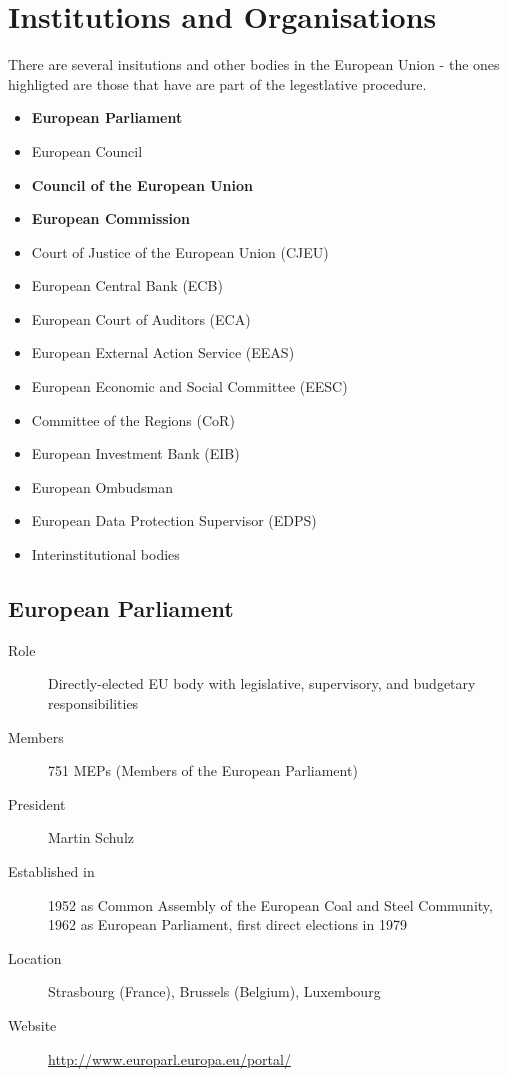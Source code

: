 \section{Institutions and Organisations}
\label{sec:InstitutionsAndOrganisations}

There are several insitutions and other bodies in the European Union - the ones highligted are those that have are part of the legestlative procedure.

\begin{itemize}
\item \textbf{European Parliament}
\item European Council
\item \textbf{Council of the European Union}
\item \textbf{European Commission}
\item Court of Justice of the European Union (CJEU)
\item European Central Bank (ECB)
\item European Court of Auditors (ECA)
\item European External Action Service (EEAS)
\item European Economic and Social Committee (EESC)
\item Committee of the Regions (CoR)
\item European Investment Bank (EIB)
\item European Ombudsman
\item European Data Protection Supervisor (EDPS)
\item Interinstitutional bodies
\end{itemize}

\subsection{European Parliament}
\begin{description}
	\item[Role] Directly-elected EU body with legislative, supervisory, and budgetary responsibilities
	\item[Members] 751 MEPs (Members of the European Parliament)
	\item[President] Martin Schulz
	\item[Established in] 1952 as Common Assembly of the European Coal and Steel Community, 1962 as European Parliament, first direct elections in 1979
	\item[Location] Strasbourg (France), Brussels (Belgium), Luxembourg
	\item[Website] \href{http://www.europarl.europa.eu/portal/}{http://www.europarl.europa.eu/portal/}
\end{description}

